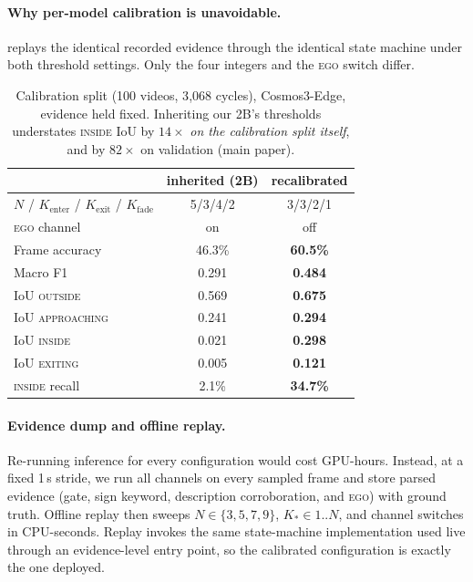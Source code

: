 \documentclass[10pt,twocolumn,letterpaper]{article}
\begin{document}
\paragraph{Why per-model calibration is unavoidable.}   replays the identical recorded evidence through the identical state machine under both threshold settings.  Only the four integers and the \textsc{ego} switch differ.

\begin{table}[t]
\centering\small
\begin{tabular}{@{}lcc@{}}
\toprule
 & inherited (2B) & recalibrated \\
\midrule
$N$ / $K_\text{enter}$ / $K_\text{exit}$ / $K_\text{fade}$ & 5/3/4/2 & 3/3/2/1 \\
\textsc{ego} channel & on & off \\
\midrule
Frame accuracy & 46.3\% & \textbf{60.5\%} \\
Macro F1 & 0.291 & \textbf{0.484} \\
IoU \textsc{outside} & 0.569 & \textbf{0.675} \\
IoU \textsc{approaching} & 0.241 & \textbf{0.294} \\
IoU \textsc{inside} & 0.021 & \textbf{0.298} \\
IoU \textsc{exiting} & 0.005 & \textbf{0.121} \\
\textsc{inside} recall & 2.1\% & \textbf{34.7\%} \\
\bottomrule
\end{tabular}
\caption{Calibration split (100 videos, 3{,}068 cycles), Cosmos3-Edge, evidence held fixed.  Inheriting our 2B's thresholds understates \textsc{inside} IoU by $14\times$ \emph{on the calibration split itself}, and by $82\times$ on validation (main paper).}
\label{supp:tab:calib}
\end{table}

\paragraph{Evidence dump and offline replay.}  Re-running inference for every configuration would cost GPU-hours.  Instead, at a fixed 1\,s stride, we run all channels on every sampled frame and store parsed evidence (gate, sign keyword, description corroboration, and \textsc{ego}) with ground truth.  Offline replay then sweeps $N\in\{3,5,7,9\}$, $K_\ast\in1..N$, and channel switches in CPU-seconds.  Replay invokes the same state-machine implementation used live through an evidence-level entry point, so the calibrated configuration is exactly the one deployed.
\end{document}
